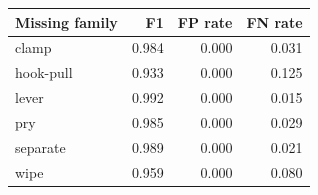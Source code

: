 \begin{tabular}{lrrr}
\toprule
Missing family & F1 & FP rate & FN rate \\
\midrule
clamp & 0.984 & 0.000 & 0.031 \\
hook-pull & 0.933 & 0.000 & 0.125 \\
lever & 0.992 & 0.000 & 0.015 \\
pry & 0.985 & 0.000 & 0.029 \\
separate & 0.989 & 0.000 & 0.021 \\
wipe & 0.959 & 0.000 & 0.080 \\
\bottomrule
\end{tabular}

